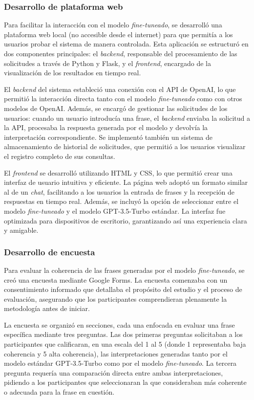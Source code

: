 \subsubsection{Desarrollo de plataforma web}

Para facilitar la interacción con el modelo \textit{fine-tuneado}, se desarrolló una plataforma web local (no accesible desde el internet) para que permitía a los usuarios probar el sistema de manera controlada. Esta aplicación se estructuró en dos componentes principales: el \textit{backend}, responsable del procesamiento de las solicitudes a través de Python y Flask, y el \textit{frontend}, encargado de la visualización de los resultados en tiempo real.

El \textit{backend} del sistema estableció una conexión con el API de OpenAI, lo que permitió la interacción directa tanto con el modelo \textit{fine-tuneado} como con otros modelos de OpenAI. Además, se encargó de gestionar las solicitudes de los usuarios: cuando un usuario introducía una frase, el \textit{backend} enviaba la solicitud a la API, procesaba la respuesta generada por el modelo y devolvía la interpretación correspondiente. Se implementó también un sistema de almacenamiento de historial de solicitudes, que permitió a los usuarios visualizar el registro completo de sus consultas.

El \textit{frontend} se desarrolló utilizando HTML y CSS, lo que permitió crear una interfaz de usuario intuitiva y eficiente. La página web adoptó un formato similar al de un \textit{chat}, facilitando a los usuarios la entrada de frases y la recepción de respuestas en tiempo real. Además, se incluyó la opción de seleccionar entre el modelo \textit{fine-tuneado} y el modelo GPT-3.5-Turbo estándar. La interfaz fue optimizada para dispositivos de escritorio, garantizando así una experiencia clara y amigable.


\subsubsection{Desarrollo de encuesta}

Para evaluar la coherencia de las frases generadas por el modelo \textit{fine-tuneado}, se creó una encuesta mediante Google Forms. La encuesta comenzaba con un consentimiento informado que detallaba el propósito del estudio y el proceso de evaluación, asegurando que los participantes comprendieran plenamente la metodología antes de iniciar. 

La encuesta se organizó en secciones, cada una enfocada en evaluar una frase específica mediante tres preguntas. Las dos primeras preguntas solicitaban a los participantes que calificaran, en una escala del 1 al 5 (donde 1 representaba baja coherencia y 5 alta coherencia), las interpretaciones generadas tanto por el modelo estándar GPT-3.5-Turbo como por el modelo \textit{fine-tuneado}. La tercera pregunta requería una comparación directa entre ambas interpretaciones, pidiendo a los participantes que seleccionaran la que consideraban más coherente o adecuada para la frase en cuestión.

